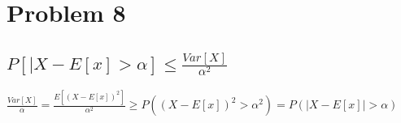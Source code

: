 \section{Problem 8}
\subsection{$P[|X-E[x]>\alpha] \leq \frac{Var[X]}{\alpha^2}$}
$\frac{Var[X]}{\alpha} = \frac{E[(X-E[x])^2]}{\alpha^2} \ge P((X-E[x])^2>\alpha^2) = P(|X-E[x]|>\alpha)$
